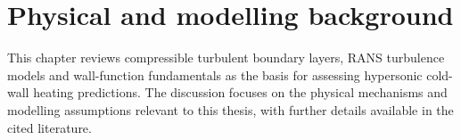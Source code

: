 \chapter{Physical and modelling background}
\label{chap:physical-modelling-background}

This chapter reviews compressible turbulent boundary layers, RANS turbulence models and wall-function fundamentals as the basis for assessing hypersonic cold-wall heating predictions. The discussion focuses on the physical mechanisms and modelling assumptions relevant to this thesis, with further details available in the cited literature.




